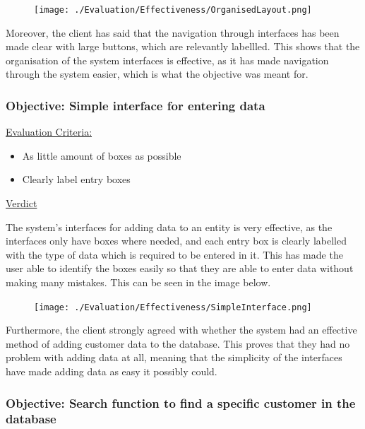 \begin{figure}[H]
    \texttt{[image: ./Evaluation/Effectiveness/OrganisedLayout.png]}
    \label{fig:OrganisedLayout}
\end{figure}

Moreover, the client has said that the navigation through interfaces has been made clear with large buttons, which are relevantly labellled. This shows that the organisation of the system interfaces is effective, as it has made navigation through the system easier, which is what the objective was meant for.


\subsubsection{Objective: Simple interface for entering data}

\underline{Evaluation Criteria:}

\begin{itemize}
    \item As little amount of boxes as possible
    \item Clearly label entry boxes
\end{itemize}

\underline{Verdict}

The system's interfaces for adding data to an entity is very effective, as the interfaces only have boxes where needed, and each entry box is clearly labelled with the type of data which is required to be entered in it. This has made the user able to identify the boxes easily so that they are able to enter data without making many mistakes. This can be seen in the image below.

\begin{figure}[H]
    \texttt{[image: ./Evaluation/Effectiveness/SimpleInterface.png]}
    \label{fig:SimpleInterface}
\end{figure}

Furthermore, the client strongly agreed with whether the system had an effective method of adding customer data to the database. This proves that they had no problem with adding data at all, meaning that the simplicity of the interfaces have made adding data as easy it possibly could.


\subsubsection{Objective: Search function to find a specific customer in the database}

